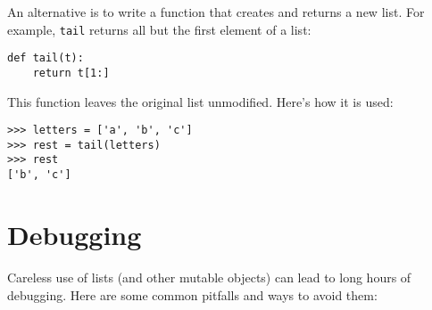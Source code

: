 \documentclass[10pt]{book}
\begin{document}
An alternative is to write a function that creates and
returns a new list.  For
example, {\tt tail} returns all but the first
element of a list:

\begin{verbatim}
def tail(t):
    return t[1:]
\end{verbatim}
%
This function leaves the original list unmodified.
Here's how it is used:

\begin{verbatim}
>>> letters = ['a', 'b', 'c']
>>> rest = tail(letters)
>>> rest
['b', 'c']
\end{verbatim}



\section{Debugging}

Careless use of lists (and other mutable objects)
can lead to long hours of debugging.  Here are some common
pitfalls and ways to avoid them:
\end{document}
